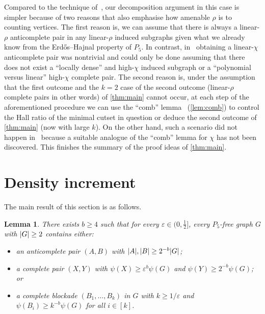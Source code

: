 \documentclass[11pt,reqno]{amsart}
\newtheorem{lemma}[theorem]{Lemma}
\newcommand{\dd}{\textquotedblleft}
\newcommand{\ee}{\textquotedblright}
\newcommand{\eps}{\varepsilon}
\newcommand{\erh}{Erd\H{o}s--Hajnal}
\DeclarePairedDelimiter\abs{\lvert}{\rvert}%
\begin{document}
	Compared to the technique of~\cite[Section 4]{2024p5}, our decomposition argument in this case is simpler because of two reasons that also emphasise how amenable $\rho$ is to counting vertices.
	The first reason is, we can assume that there is always a linear-$\rho$ anticomplete pair in any linear-$\rho$ induced subgraphs given what we already know from the \erh{} property of $P_5$.
	In contrast, in~\cite{2024p5} obtaining a linear-$\chi$ anticomplete pair was nontrivial and could only be done assuming that there does not exist a ``locally dense'' and high-$\chi$ induced subgraph or a ``polynomial versus linear'' high-$\chi$ complete pair.
	The second reason is, under the assumption that the first outcome and the $k=2$ case of the second outcome (linear-$\rho$ complete pairs in other words) of \cref{thm:main} cannot occur, at each step of the aforementioned procedure we can use the \dd comb\ee{} lemma~\cite{MR4563865} (\cref{lem:comb}) to control the Hall ratio of the minimal cutset in question or deduce the second outcome of \cref{thm:main} (now with large $k$).
	On the other hand, such a scenario did not happen in~\cite{2024p5} because a suitable analogue of the \dd comb\ee{} lemma for $\chi$ has not been discovered.
	This finishes the summary of the proof ideas of \cref{thm:main}.
	
	\section{Density increment}
	\label{sec:incre}
	The main result of this section is as follows.
	\begin{lemma}
		\label{lem:incre}
		There exists $b\ge4$ such that for every $\eps\in(0,\frac12]$, every $P_5$-free graph $G$ with $\abs G\ge2$ contains either:
		\begin{itemize}
			\item an anticomplete pair $(A,B)$ with $\abs A,\abs B\ge2^{-b}\abs G$;
			
			\item a complete pair $(X,Y)$ with $\psi(X)\ge \eps^b\psi(G)$ and $\psi(Y)\ge2^{-b}\psi(G)$; or
			
			\item a complete blockade $(B_1,\ldots,B_k)$ in $G$ with $k\ge1/\eps$ and $\psi(B_i)\ge k^{-b}\psi(G)$ for all $i\in[k]$.
		\end{itemize}
	\end{lemma}
	
\end{document}
